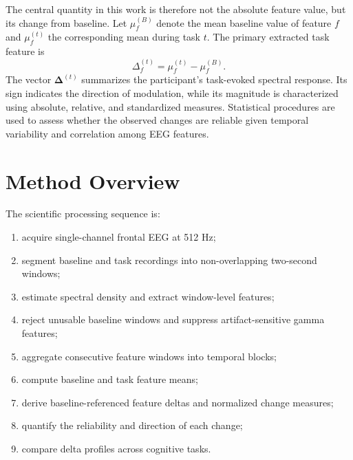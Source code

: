 \documentclass[conference]{IEEEtran}
\begin{document}
The central quantity in this work is therefore not the absolute feature value, but its change from baseline. Let $\mu_f^{(B)}$ denote the mean baseline value of feature $f$ and $\mu_f^{(t)}$ the corresponding mean during task $t$. The primary extracted task feature is
\begin{equation}
\Delta_f^{(t)}=\mu_f^{(t)}-\mu_f^{(B)}.
\end{equation}
The vector $\boldsymbol{\Delta}^{(t)}$ summarizes the participant's task-evoked spectral response. Its sign indicates the direction of modulation, while its magnitude is characterized using absolute, relative, and standardized measures. Statistical procedures are used to assess whether the observed changes are reliable given temporal variability and correlation among EEG features.

\section{Method Overview}
The scientific processing sequence is:
\begin{enumerate}
\item acquire single-channel frontal EEG at 512 Hz;
\item segment baseline and task recordings into non-overlapping two-second windows;
\item estimate spectral density and extract window-level features;
\item reject unusable baseline windows and suppress artifact-sensitive gamma features;
\item aggregate consecutive feature windows into temporal blocks;
\item compute baseline and task feature means;
\item derive baseline-referenced feature deltas and normalized change measures;
\item quantify the reliability and direction of each change;
\item compare delta profiles across cognitive tasks.
\end{enumerate}
\end{document}
